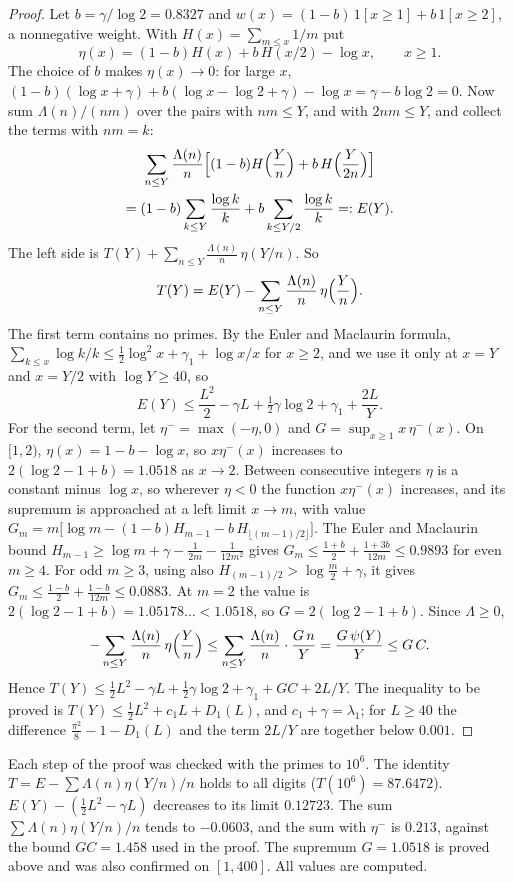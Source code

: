 \begin{proof}
Let $b=\gamma/\log2=0.8327$ and $w(x)=(1-b)\,1[x\ge1]+b\,1[x\ge2]$, a nonnegative weight. With $H(x)=\sum_{m\le x}1/m$ put
\[
\eta(x)=(1-b)H(x)+b\,H(x/2)-\log x,\qquad x\ge1 .
\]
The choice of $b$ makes $\eta(x)\to0$: for large $x$, $(1-b)(\log x+\gamma)+b(\log x-\log2+\gamma)-\log x=\gamma-b\log2=0$. Now sum $\Lambda(n)/(nm)$ over the pairs with $nm\le Y$, and with $2nm\le Y$, and collect the terms with $nm=k$:
\begin{multline*}
\sum_{n\le Y}\frac{\Lambda(n)}n\Bigl[(1-b)H\Bigl(\frac Yn\Bigr)+b\,H\Bigl(\frac Y{2n}\Bigr)\Bigr]\\
=(1-b)\sum_{k\le Y}\frac{\log k}k+b\sum_{k\le Y/2}\frac{\log k}k=:E(Y).
\end{multline*}
The left side is $T(Y)+\sum_{n\le Y}\frac{\Lambda(n)}n\,\eta(Y/n)$. So
\[
T(Y)=E(Y)-\sum_{n\le Y}\frac{\Lambda(n)}n\,\eta\Bigl(\frac Yn\Bigr).
\]
The first term contains no primes. By the Euler and Maclaurin formula, $\sum_{k\le x}\log k/k\le\frac12\log^2x+\gamma_1+\log x/x$ for $x\ge2$, and we use it only at $x=Y$ and $x=Y/2$ with $\log Y\ge40$, so
\[
E(Y)\le\frac{L^2}2-\gamma L+\tfrac12\gamma\log2+\gamma_1+\frac{2L}{Y}.
\]
For the second term, let $\eta^-=\max(-\eta,0)$ and $G=\sup_{x\ge1}x\,\eta^-(x)$. On $[1,2)$, $\eta(x)=1-b-\log x$, so $x\eta^-(x)$ increases to $2(\log2-1+b)=1.0518$ as $x\to2$. Between consecutive integers $\eta$ is a constant minus $\log x$, so wherever $\eta<0$ the function $x\eta^-(x)$ increases, and its supremum is approached at a left limit $x\to m$, with value $G_m=m\bigl[\log m-(1-b)H_{m-1}-b\,H_{\lfloor(m-1)/2\rfloor}\bigr]$. The Euler and Maclaurin bound $H_{m-1}\ge\log m+\gamma-\frac1{2m}-\frac1{12m^2}$ gives $G_m\le\frac{1+b}2+\frac{1+3b}{12m}\le0.9893$ for even $m\ge4$. For odd $m\ge3$, using also $H_{(m-1)/2}>\log\frac m2+\gamma$, it gives $G_m\le\frac{1-b}2+\frac{1-b}{12m}\le0.0883$. At $m=2$ the value is $2(\log2-1+b)=1.05178\ldots<1.0518$, so $G=2(\log2-1+b)$. Since $\Lambda\ge0$,
\[
-\sum_{n\le Y}\frac{\Lambda(n)}n\,\eta\Bigl(\frac Yn\Bigr)\le\sum_{n\le Y}\frac{\Lambda(n)}n\cdot\frac{G\,n}{Y}=\frac{G\,\psi(Y)}{Y}\le G\,C .
\]
Hence $T(Y)\le\frac12L^2-\gamma L+\frac12\gamma\log2+\gamma_1+GC+2L/Y$. The inequality to be proved is $T(Y)\le\frac12L^2+c_1L+D_1(L)$, and $c_1+\gamma=\lambda_1$; for $L\ge40$ the difference $\frac{\pi^2}8-1-D_1(L)$ and the term $2L/Y$ are together below $0.001$.
\end{proof}

\begin{computation}\label{bo:comp:elementary}
Each step of the proof was checked with the primes to $10^6$. The identity $T=E-\sum\Lambda(n)\eta(Y/n)/n$ holds to all digits ($T(10^6)=87.6472$). $E(Y)-(\frac12L^2-\gamma L)$ decreases to its limit $0.12723$. The sum $\sum\Lambda(n)\eta(Y/n)/n$ tends to $-0.0603$, and the sum with $\eta^-$ is $0.213$, against the bound $GC=1.458$ used in the proof. The supremum $G=1.0518$ is proved above and was also confirmed on $[1,400]$. All values are computed.
\end{computation}

